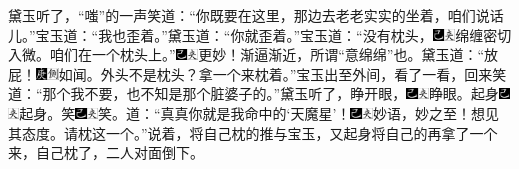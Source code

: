 黛玉听了，``嗤''的一声笑道：``你既要在这里，那边去老老实实的坐着，咱们说话儿。''宝玉道：``我也歪着。''黛玉道：``你就歪着。''宝玉道：``没有枕头，{\includegraphics[width=3mm]{../Images/00003}\includegraphics[width=3mm]{../Images/00012}\footnotesize \kaishu 绵缠密切入微。}咱们在一个枕头上。''{\includegraphics[width=3mm]{../Images/00003}\includegraphics[width=3mm]{../Images/00012}\footnotesize \kaishu 更妙！渐逼渐近，所谓``意绵绵''也。}黛玉道：``放屁！{\includegraphics[width=3mm]{../Images/00004}\includegraphics[width=3mm]{../Images/00011}\footnotesize \kaishu 如闻。}外头不是枕头？拿一个来枕着。''宝玉出至外间，看了一看，回来笑道：``那个我不要，也不知是那个脏婆子的。''黛玉听了，睁开眼，{\includegraphics[width=3mm]{../Images/00003}\includegraphics[width=3mm]{../Images/00012}\footnotesize \kaishu 睁眼。}起身{\includegraphics[width=3mm]{../Images/00003}\includegraphics[width=3mm]{../Images/00012}\footnotesize \kaishu 起身。}笑{\includegraphics[width=3mm]{../Images/00003}\includegraphics[width=3mm]{../Images/00012}\footnotesize \kaishu 笑。}道：``真真你就是我命中的`天魔星'！{\includegraphics[width=3mm]{../Images/00003}\includegraphics[width=3mm]{../Images/00012}\footnotesize \kaishu 妙语，妙之至！想见其态度。}请枕这一个。''说着，将自己枕的推与宝玉，又起身将自己的再拿了一个来，自己枕了，二人对面倒下。

